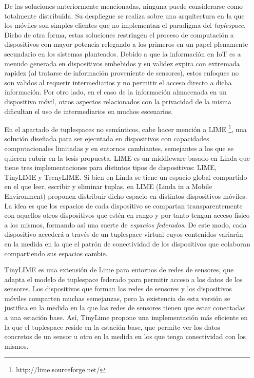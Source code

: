 De las soluciones anteriormente mencionadas, ninguna puede considerarse como totalmente distribuida. Su despliegue se realiza sobre una arquitectura en la que los móviles son simples clientes que no implementan el paradigma del \textit{tuplespace}. Dicho de otra forma, estas soluciones restringen el proceso de computación a dispositivos con mayor potencia relegando a los primeros en un papel plenamente secundario en los sistemas planteados. Debido a que la información en IoT es a menudo generada en dispositivos embebidos y su validez expira con extremada rapidez (al tratarse de información proveniente de sensores), estos enfoques no son validos al requerir intermediarios y no permitir el acceso directo a dicha información. Por otro lado, en el caso de la información almacenada en un dispositivo móvil, otros aspectos relacionados con la privacidad de la misma dificultan el uso de intermediarios en muchos escenarios.

En el apartado de tuplespaces no semánticos, cabe hacer mención a LIME \footnote{http://lime.sourceforge.net/}, una solución diseñada para ser ejecutada en dispositivos con capacidades computacionales limitadas y en entornos cambiantes, semejantes a los que se quieren cubrir en la tesis propuesta. LIME es un middleware basado en Linda que tiene tres implementaciones para distintos tipos de dispositivos: LIME, TinyLIME y TeenyLIME. Si bien en Linda se tiene un espacio global compartido en el que leer, escribir y eliminar tuplas, en LIME (Linda in a Mobile Environment)\cite{murphy_lime:_2006} proponen distribuir dicho espacio en distintos dispositivos móviles. La idea es que los espacios de cada dispositivo se compartan transparentemente con aquellos otros dispositivos que estén en rango y por tanto tengan acceso físico a los mismos, formando así una suerte de \textit{espacios federados}. De este modo, cada dispositivo accederá a través de un tuplespace virtual cuyos contenidos variarán en la medida en la que 
el patrón de conectividad de los dispositivos que colaboran compartiendo sus espacios cambie.

TinyLIME\cite{curino_mobile_2005} es una extensión de Lime para entornos de redes de sensores, que adapta el modelo de tuplespace federado para permitir acceso a los datos de los sensores. Los dispositivos que forman las redes de sensores y los dispositivos móviles comparten muchas semejanzas, pero la existencia de esta versión se justifica en la medida en la que las redes de sensores tienen que estar conectadas a una estación base. Así, TinyLime propone una implementación más eficiente en la que el tuplespace reside en la estación base, que permite ver los datos concretos de un sensor u otro en la medida en los que tenga conectividad con los mismos.

